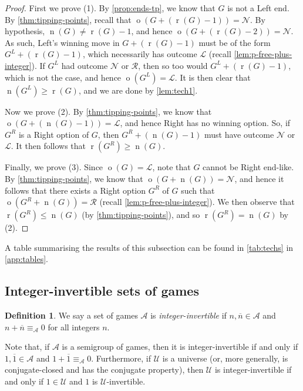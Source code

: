 \documentclass[11pt]{article}
\theoremstyle{definition}
\newtheorem{definition}[theorem]{Definition}
\DeclareMathOperator{\outcome}{o}
\newcommand{\set}[1]{\mathcal{#1}}
\DeclareMathOperator{\ntp}{n}
\DeclareMathOperator{\rtp}{r}
\begin{document}
\begin{proof}
    First we prove (1). By \cref{prop:ends-tp}, we know that $G$ is not a Left
    end. By \cref{thm:tipping-points}, recall that
    $\outcome(G+(\rtp(G)-1))=\mathscr{N}$. By hypothesis,
    $\ntp(G)\neq\rtp(G)-1$, and hence $\outcome(G+(\rtp(G)-2))=\mathscr{N}$. As
    such, Left's winning move in $G+(\rtp(G)-1)$ must be of the form
    $G^L+(\rtp(G)-1)$, which necessarily has outcome $\mathscr{L}$ (recall
    \cref{lem:p-free-plus-integer}). If $G^L$ had outcome $\mathscr{N}$ or
    $\mathscr{R}$, then so too would $G^L+(\rtp(G)-1)$, which is not the case,
    and hence $\outcome(G^L)=\mathscr{L}$. It is then clear that
    $\ntp(G^L)\geq\rtp(G)$, and we are done by \cref{lem:tech1}.

    Now we prove (2). By \cref{thm:tipping-points}, we know that
    $\outcome(G+(\ntp(G)-1))=\mathscr{L}$, and hence Right has no winning
    option. So, if $G^R$ is a Right option of $G$, then $G^R+(\ntp(G)-1)$ must
    have outcome $\mathscr{N}$ or $\mathscr{L}$. It then follows that
    $\rtp(G^R)\geq \ntp(G)$.

    Finally, we prove (3). Since $\outcome(G)=\mathscr{L}$, note that $G$
    cannot be Right end-like. By \cref{thm:tipping-points}, we know that
    $\outcome(G+\ntp(G))=\mathscr{N}$, and hence it follows that there exists a
    Right option $G^R$ of $G$ such that $\outcome(G^R+\ntp(G))=\mathscr{R}$
    (recall \cref{lem:p-free-plus-integer}). We then observe that
    $\rtp(G^R)\leq\ntp(G)$ (by \cref{thm:tipping-points}), and so
    $\rtp(G^R)=\ntp(G)$ by (2).
\end{proof}

A table summarising the results of this subsection can be found in
\cref{tab:techs} in \cref{app:tables}.

\subsection{Integer-invertible sets of games}
\label{sec:int}

\begin{definition}
    \label{def:integral}
    We say a set of games $\set{A}$ is \emph{integer-invertible} if
    $n,\overline{n}\in\set{A}$ and $n+\overline{n}\equiv_\set{A}0$ for all
    integers $n$.
\end{definition}

Note that, if $\set{A}$ is a semigroup of games, then it is integer-invertible
if and only if $1,\overline{1}\in\set{A}$ and $1+\overline{1}\equiv_\set{A}0$.
Furthermore, if $\set{U}$ is a universe (or, more generally, is
conjugate-closed and has the conjugate property), then $\set{U}$ is
integer-invertible if and only if $1\in\set{U}$ and $1$ is
$\set{U}$-invertible.
\end{document}
